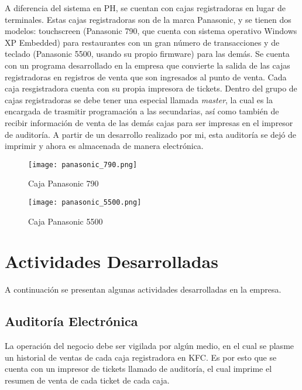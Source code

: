 A diferencia del sistema en PH, se cuentan con cajas registradoras en lugar de terminales. Estas cajas registradoras son de la marca Panasonic, y se tienen dos modelos: touchscreen (Panasonic 790, que cuenta con sistema operativo Windows XP Embedded) para restaurantes con un gran número de transacciones y de teclado (Panasonic 5500, usando su propio firmware) para las demás. Se cuenta con un programa desarrollado en la empresa que convierte la salida de las cajas registradoras en registros de venta que son ingresados al punto de venta. Cada caja resgistradora cuenta con su propia impresora de tickets. Dentro del grupo de cajas registradoras se debe tener una especial llamada \textit{master}, la cual es la encargada de trasmitir programación a las secundarias, así como también de recibir información de venta de las demás cajas para ser impresas en el impresor de auditoría. A partir de un desarrollo realizado por mi, esta auditoría se dejó de imprimir y ahora es almacenada de manera electrónica.

\begin{figure}[htb]
 \begin{center}
  \texttt{[image: panasonic\_790.png]}
 \end{center}
 \caption{Caja Panasonic 790}
 \label{fig:pana_790}
\end{figure}

\begin{figure}[htb]
 \begin{center}
  \texttt{[image: panasonic\_5500.png]}
 \end{center}
 \caption{Caja Panasonic 5500}
 \label{fig:pana_5500}
\end{figure}


\section{Actividades Desarrolladas}
\label{sec:rep_desarrollo}

A continuación se presentan algunas actividades desarrolladas en la empresa.

\subsection{Auditoría Electrónica}
\label{sec:auditoria}

La operación del negocio debe ser vigilada por algún medio, en el cual se plasme un historial de ventas de cada caja registradora en KFC. Es por esto que se cuenta con un impresor de tickets llamado de auditoría, el cual imprime el resumen de venta de cada ticket de cada caja.

